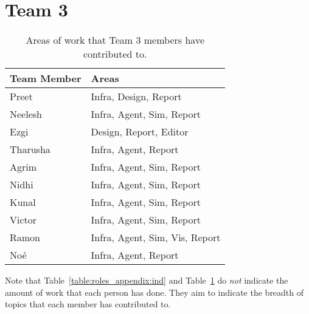 \section{Team 3}
\label{sec:roles_appendix:team3}

\begin{table}[H]
    \centering
    \begin{tabular}{|l|l|}
    \hline
    \textbf{Team Member} & \textbf{Areas}     \\ \hline
    Preet  & Infra, Design, Report         \\
    Neelesh  & Infra, Agent, Sim, Report                 \\
    Ezgi     & Design, Report, Editor        \\
    Tharusha     & Infra, Agent, Report \\
    Agrim    & Infra, Agent, Sim, Report                      \\
    Nidhi  & Infra, Agent, Sim, Report                        \\
    Kunal    & Infra, Agent, Sim, Report  \\
    Victor & Infra, Agent, Sim, Report  \\ 
    Ramon &  Infra, Agent, Sim, Vis, Report \\
    Noé &   Infra, Agent, Report \\   \hline
\end{tabular}
\caption{Areas of work that Team 3 members have contributed to.}
\label{sec:roles_appendix:team1}
\end{table}



Note that Table~\ref{table:roles_appendix:ind} and Table~\ref{sec:roles_appendix:team3} do \emph{not} indicate the amount of work that each person has done. They aim to indicate the breadth of topics that each member has contributed to. 